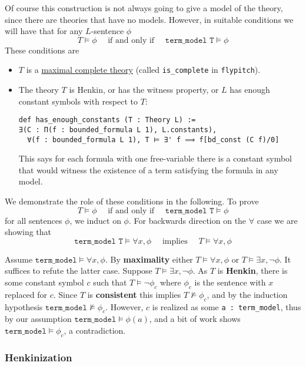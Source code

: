 \documentclass{article}
\newcommand{\<}{\langle}
\renewcommand{\>}{\rangle}
\newcommand{\linkto}[2]{\hyperlink{#1}{#2}}
\theoremstyle{definitionstyle}
\theoremstyle{exercisestyle}
\theoremstyle{remarkstyle}
\begin{document}
Of course this construction is not always going to give a model of the
theory, since there are theories that have no models.
However, in suitable conditions we will have that for any $L$-sentence $\phi$
\[
  T \vDash \phi \quad \text{ if and only if } \quad
  \texttt{term\_model T} \vDash \phi
\]
These conditions are
\begin{itemize}
  \item $T$ is a \linkto{is_complete_theory}{maximal complete theory}
        (called \texttt{is\_complete} in \texttt{flypitch}).
  \item The theory $T$ is Henkin, or has the witness property,
        or $L$ has enough constant symbols with respect to $T$:
\begin{lstlisting}
def has_enough_constants (T : Theory L) :=
∃(C : Π(f : bounded_formula L 1), L.constants),
  ∀(f : bounded_formula L 1), T ⊨ ∃' f ⟹ f[bd_const (C f)/0] \end{lstlisting}
        This says for each formula with one free-variable
        there is a constant symbol that would witness the
        existence of a term satisfying the formula in any model.
\end{itemize}

We demonstrate the role of these conditions in the following.
To prove
\[ T \vDash \phi \quad \text{ if and only if } \quad
  \texttt{term\_model T} \vDash \phi \]
for all sentences $\phi$, we induct on $\phi$.
For backwards direction on the $\forall$ case
we are showing that
\[ \texttt{term\_model T} \vDash \forall x, \phi \quad \text{ implies }
  \quad T \vDash \forall x, \phi \]

Assume $\texttt{term\_model} \vDash \forall x, \phi$.
By \textbf{maximality} either $T \vDash \forall x, \phi$ or
$T \vDash \exists x, \neg \phi$.
It suffices to refute the latter case.
Suppose $T \vDash \exists x, \neg \phi$.
As $T$ is \textbf{Henkin},
there is some constant symbol $c$ such that $T \vDash \neg \phi_{c}$
where $\phi_{c}$ is the sentence with $x$ replaced for $c$.
Since $T$ is \textbf{consistent} this implies $T \nvDash \phi_{c}$,
and by the induction hypothesis $\texttt{term\_model} \nvDash \phi_{c}$.
However, $c$ is realized as some \texttt{a : term\_model},
thus by our assumption $\texttt{term\_model} \vDash \phi(a)$,
and a bit of work shows $\texttt{term\_model} \vDash \phi_{c}$,
a contradiction.

\subsubsection{Henkinization}
\end{document}
